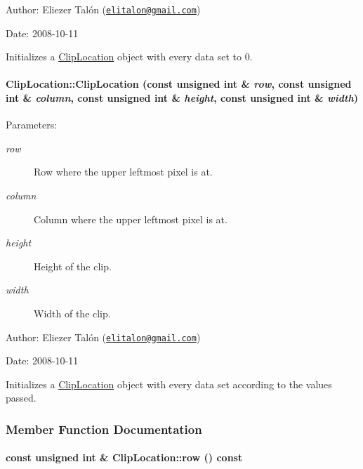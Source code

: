 \begin{Desc}
\item[Author:]Eliezer Talón (\href{mailto:elitalon@gmail.com}{\tt elitalon@gmail.com}) \end{Desc}
\begin{Desc}
\item[Date:]2008-10-11\end{Desc}
Initializes a \hyperlink{class_clip_location}{ClipLocation} object with every data set to 0. \hypertarget{class_clip_location_b41ff36c161d2d909c6e75474f5f2f31}{
\paragraph[ClipLocation]{\setlength{\rightskip}{0pt plus 5cm}ClipLocation::ClipLocation (const unsigned int \& {\em row}, \/  const unsigned int \& {\em column}, \/  const unsigned int \& {\em height}, \/  const unsigned int \& {\em width})}\hfill}
\label{class_clip_location_b41ff36c161d2d909c6e75474f5f2f31}


\begin{Desc}
\item[Parameters:]
\begin{description}
\item[{\em row}]Row where the upper leftmost pixel is at. \item[{\em column}]Column where the upper leftmost pixel is at. \item[{\em height}]Height of the clip. \item[{\em width}]Width of the clip.\end{description}
\end{Desc}
\begin{Desc}
\item[Author:]Eliezer Talón (\href{mailto:elitalon@gmail.com}{\tt elitalon@gmail.com}) \end{Desc}
\begin{Desc}
\item[Date:]2008-10-11\end{Desc}
Initializes a \hyperlink{class_clip_location}{ClipLocation} object with every data set according to the values passed. 

\subsubsection{Member Function Documentation}
\hypertarget{class_clip_location_8816c925e80c2e55bbbbdd6da799f53f}{
\paragraph[row]{\setlength{\rightskip}{0pt plus 5cm}const unsigned int \& ClipLocation::row () const}\hfill}
\label{class_clip_location_8816c925e80c2e55bbbbdd6da799f53f}


